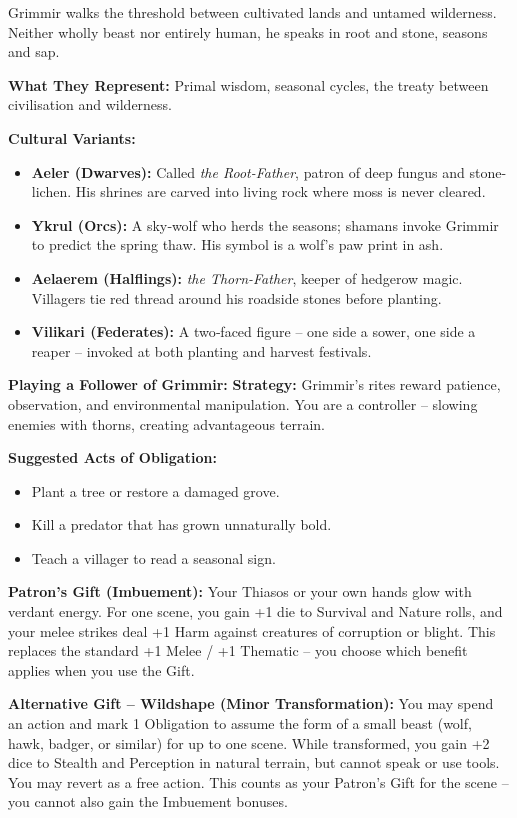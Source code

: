\documentclass[10pt,a5paper]{book}
\begin{document}
Grimmir walks the threshold between cultivated lands and untamed wilderness. Neither wholly beast nor entirely human, he speaks in root and stone, seasons and sap.

\textbf{What They Represent:} Primal wisdom, seasonal cycles, the treaty between civilisation and wilderness.

\textbf{Cultural Variants:}
\begin{itemize}
    \item \textbf{Aeler (Dwarves):} Called \textit{the Root-Father}, patron of deep fungus and stone-lichen. His shrines are carved into living rock where moss is never cleared.
    \item \textbf{Ykrul (Orcs):} A sky‑wolf who herds the seasons; shamans invoke Grimmir to predict the spring thaw. His symbol is a wolf's paw print in ash.
    \item \textbf{Aelaerem (Halflings):} \textit{the Thorn-Father}, keeper of hedgerow magic. Villagers tie red thread around his roadside stones before planting.
    \item \textbf{Vilikari (Federates):} A two‑faced figure -- one side a sower, one side a reaper -- invoked at both planting and harvest festivals.
\end{itemize}

\textbf{Playing a Follower of Grimmir:}
\textbf{Strategy:} Grimmir's rites reward patience, observation, and environmental manipulation. You are a controller -- slowing enemies with thorns, creating advantageous terrain.

\textbf{Suggested Acts of Obligation:}
\begin{itemize}
    \item Plant a tree or restore a damaged grove.
    \item Kill a predator that has grown unnaturally bold.
    \item Teach a villager to read a seasonal sign.
\end{itemize}

\textbf{Patron's Gift (Imbuement):} Your Thiasos or your own hands glow with verdant energy. For one scene, you gain +1 die to Survival and Nature rolls, and your melee strikes deal +1 Harm against creatures of corruption or blight. This replaces the standard +1 Melee / +1 Thematic -- you choose which benefit applies when you use the Gift.

\textbf{Alternative Gift -- Wildshape (Minor Transformation):} You may spend an action and mark 1 Obligation to assume the form of a small beast (wolf, hawk, badger, or similar) for up to one scene. While transformed, you gain +2 dice to Stealth and Perception in natural terrain, but cannot speak or use tools. You may revert as a free action. This counts as your Patron's Gift for the scene -- you cannot also gain the Imbuement bonuses.
\end{document}
